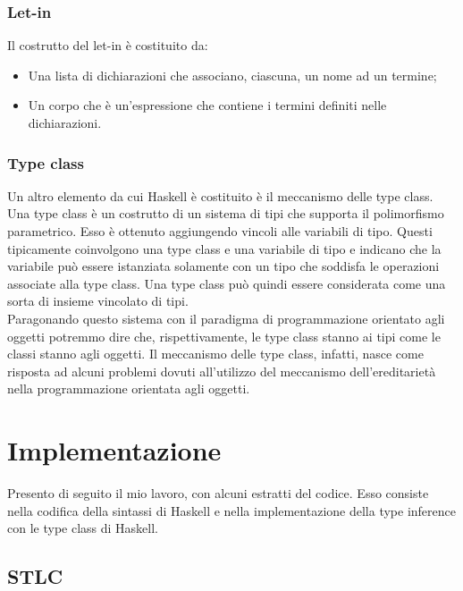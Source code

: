 \documentclass[12pt,a4paper,openright,twoside]{report}
\begin{document}
\subsection{Let-in}
Il costrutto del let-in è costituito da:
\begin{itemize}
 \item Una lista di dichiarazioni che associano, ciascuna, un nome ad un termine;
 \item Un corpo che è un'espressione che contiene i termini definiti nelle dichiarazioni.
\end{itemize}

\subsection{Type class}
Un altro elemento da cui Haskell è costituito è il meccanismo delle type class. Una type class è un costrutto di un sistema di tipi che supporta il polimorfismo parametrico. Esso è ottenuto aggiungendo vincoli alle variabili di tipo. Questi tipicamente coinvolgono una type class e una variabile di tipo e indicano che la variabile può essere istanziata solamente con un tipo che soddisfa le operazioni associate alla type class. Una type class può quindi essere considerata come una sorta di insieme vincolato di tipi.\\
Paragonando questo sistema con il paradigma di programmazione orientato agli oggetti potremmo dire che, rispettivamente, le type class stanno ai tipi come le classi stanno agli oggetti. Il meccanismo delle type class, infatti, nasce come risposta ad alcuni problemi dovuti all'utilizzo del meccanismo dell'ereditarietà nella programmazione orientata agli oggetti.

\clearpage{\pagestyle{empty}\cleardoublepage}	%


\chapter{Implementazione}		%

\lhead[\fancyplain{}{\bfseries\thepage}]{\fancyplain{}{\bfseries\rightmark}}	%

Presento di seguito il mio lavoro, con alcuni estratti del codice. Esso consiste nella codifica della sintassi di Haskell e nella implementazione della type inference con le type class di Haskell.

\section{STLC}
\end{document}
